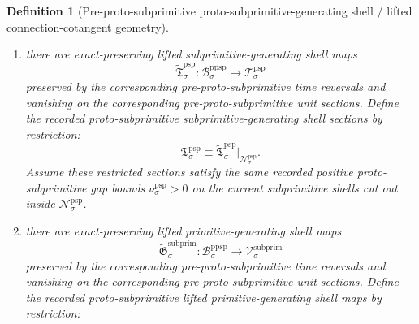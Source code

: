 \documentclass[11pt]{article}
\newcommand{\SubprimTarget}[1]{\mathcal V_{#1}^{\mathrm{subprim}}}
\newcommand{\ProtoSubprimTarget}[1]{\mathcal T_{#1}^{\mathrm{psp}}}
\newcommand{\ProtoSubprimGap}[1]{\nu_{#1}^{\mathrm{psp}}}
\newcommand{\PreProtoSubprimTargetMetric}[1]{x_{#1}^{\mathrm{ppsp}}}
\newcommand{\PreProtoSubprimGap}[1]{\omega_{#1}^{\mathrm{ppsp}}}
\newcommand{\ProtoSubprimSpace}[1]{\mathcal N_{#1}^{\mathrm{psp}}}
\newcommand{\ProtoSubprimSection}[1]{\mathfrak T_{#1}^{\mathrm{psp}}}
\newcommand{\ProtoSubprimInc}[1]{\jmath_{#1}^{\mathrm{psp}}}
\newcommand{\PreProtoSubprimSpace}[1]{\mathcal B_{#1}^{\mathrm{ppsp}}}
\newcommand{\PreProtoSubprimMetric}[1]{B_{#1}^{\mathrm{ppsp}}}
\newcommand{\PreProtoSubprimSection}[1]{\mathfrak U_{#1}^{\mathrm{ppsp}}}
\newcommand{\PreProtoSubprimLiftedSubprimitive}[1]{\widetilde{\mathfrak T}_{#1}^{\mathrm{psp}}}
\newcommand{\PreProtoSubprimLiftedPrimitive}[1]{\widetilde{\mathfrak G}_{#1}^{\mathrm{subprim}}}
\newtheorem{definition}{Definition}
\begin{document}
\begin{definition}[Pre-proto-subprimitive proto-subprimitive-generating shell / lifted connection-cotangent geometry]
\begin{enumerate}
\begin{equation}
    \label{eq:protosubprimitive_shell_from_preprotosubprimitive}
    \end{equation}
    Let
    \begin{equation}
    \ProtoSubprimInc{\sigma}:\ProtoSubprimSpace{\sigma}\hookrightarrow \PreProtoSubprimSpace{\sigma}
    \label{eq:protosubprimitive_inclusion}
    \end{equation}
    be the shell inclusion. Assume this shell is a closed embedded \(C^2\) submanifold, invariant under the corresponding pre-proto-subprimitive time reversal, and containing the image of the corresponding pre-proto-subprimitive unit section. Assume further that, for every \(x\in\ProtoSubprimSpace{\sigma}\),
    \begin{equation}
    \PreProtoSubprimTargetMetric{\sigma}\!\left(
    D\PreProtoSubprimSection{\sigma}(x)\xi,
    D\PreProtoSubprimSection{\sigma}(x)\xi
    \right)
    \ge
    \PreProtoSubprimGap{\sigma}\,
    \PreProtoSubprimMetric{\sigma}(\xi,\xi),
    \qquad
    \PreProtoSubprimGap{\sigma}>0,
    \label{eq:preprotosubprimitive_gap}
    \end{equation}
    for all \(\xi\) orthogonal, with respect to \(\PreProtoSubprimMetric{\sigma}\), to \(T_x\ProtoSubprimSpace{\sigma}\).
    \item there are exact-preserving lifted subprimitive-generating shell maps
    \[
    \PreProtoSubprimLiftedSubprimitive{\sigma}:\PreProtoSubprimSpace{\sigma}\to\ProtoSubprimTarget{\sigma}
    \]
    preserved by the corresponding pre-proto-subprimitive time reversals and vanishing on the corresponding pre-proto-subprimitive unit sections. Define the recorded proto-subprimitive subprimitive-generating shell sections by restriction:
    \begin{equation}
    \ProtoSubprimSection{\sigma}\equiv \PreProtoSubprimLiftedSubprimitive{\sigma}|_{\ProtoSubprimSpace{\sigma}}.
    \label{eq:protosubprimitive_section_from_preprotosubprimitive}
    \end{equation}
    Assume these restricted sections satisfy the same recorded positive proto-subprimitive gap bounds \(\ProtoSubprimGap{\sigma}>0\) on the current subprimitive shells cut out inside \(\ProtoSubprimSpace{\sigma}\).
    \item there are exact-preserving lifted primitive-generating shell maps
    \[
    \PreProtoSubprimLiftedPrimitive{\sigma}:\PreProtoSubprimSpace{\sigma}\to\SubprimTarget{\sigma}
    \]
    preserved by the corresponding pre-proto-subprimitive time reversals and vanishing on the corresponding pre-proto-subprimitive unit sections. Define the recorded proto-subprimitive lifted primitive-generating shell maps by restriction:

\end{enumerate}
\end{definition}
\end{document}
